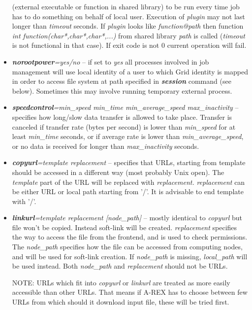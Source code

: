 \documentclass{article}                            %
\begin{document}
\begin{itemize}
(external executable or function in shared library) to be run every
time job has to do something on behalf of local user. Execution of
\emph{plugin} may not last longer than \emph{timeout} seconds. If
\emph{plugin} looks like \emph{function@path} then function \emph{int
function(char{*},char{*},char{*},...)} from shared library \emph{path}
is called (\emph{timeout} is not functional in that case). If exit
code is not 0 current operation will fail.
\item \textbf{\textit{norootpower}}\textit{=yes/no} -- if set to \emph{yes}
all processes involved in job management will use local identity of
a user to which Grid identity is mapped in order to access file system
at path specified in \textbf{\textit{session}} command (see below).
Sometimes this may involve running temporary external process.
\item \textbf{\textit{speedcontrol}}\textit{=min\_speed min\_time min\_average\_speed
max\_inactivity} -- specifies how long/slow data transfer is allowed
to take place. Transfer is canceled if transfer rate (bytes per second)
is lower than \emph{min\_speed} for at least \emph{min\_time} seconds,
or if average rate is lower than \emph{min\_average\_speed}, or no
data is received for longer than \textit{max\_inactivity} seconds.
\item \textbf{\textit{copyurl}}\textit{=template replacement} -- specifies
that URLs, starting from template should be accessed in a different
way (most probably Unix open). The \textit{template} part of the URL
will be replaced with \textit{replacement.} \textit{replacement} can
be either URL or local path starting from '/'. It is advisable to
end template with '/'.
\item \textbf{\textit{linkurl}}\textit{=template replacement {[}node\_path]}
-- mostly identical to \textit{copyurl} but file won't be copied. Instead
soft-link will be created. \textit{replacement} specifies the way
to access the file from the frontend, and is used to check permissions.
The \textit{node\_path} specifies how the file can be accessed from
computing nodes, and will be used for soft-link creation. If \textit{node\_path}
is missing, \textit{local\_path} will be used instead. Both \textit{node\_path}
and \textit{replacement} should not be URLs.
\begin{framed}
NOTE: URLs which fit into \textit{copyurl} or \textit{linkurl} are
treated as more easily accessible than other URLs. That means if A-REX
has to choose between few URLs from which should it download input
file, these will be tried first.
\end{framed}
\end{itemize}
\end{document}

